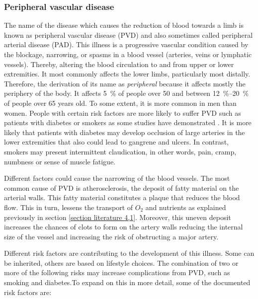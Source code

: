 \subsubsection{Peripheral vascular disease}
\label{section literature 2.1}
The name of the disease which causes the reduction of blood towards a limb is known as peripheral vascular disease (PVD) and also sometimes called peripheral arterial disease (PAD). This illness is a progressive vascular condition caused by the blockage, narrowing, or spasms in a blood vessel (arteries, veins or lymphatic vessels). Thereby, altering the blood circulation to and from upper or lower extremities.  It most commonly affects the lower limbs, particularly most distally. Therefore, the derivation of its name as \textit{peripheral} because it affects mostly the periphery of the body. It affects \SI{5}{\percent} of people over \num{50} and between \SIrange{12}{20}{\percent} of people over 65 years old. To some extent, it is more common in men than women. People with certain risk factors are more likely to suffer PVD such as patients with diabetes or smokers as some studies have demonstrated \cite{kannel1979diabetes,janka1980peripheral, menzoian1989symptomatology, eliasson2003cigarette, stephens2004cardiovascular}. It is more likely that patients with diabetes may develop occlusion of large arteries in the lower extremities that also could lead to gangrene and ulcers. In contrast, smokers may present intermittent claudication, in other words, pain, cramp, numbness or sense of muscle fatigue. 

Different factors could cause the narrowing of the blood vessels. The most common cause of PVD is atherosclerosis, the deposit of fatty material on the arterial walls. This fatty material constitutes a plaque that reduces the blood flow. This in turn, lessens the transport of $O_2$ and nutrients as explained previously in section \ref{section literature 4,1}. Moreover, this uneven deposit increases the chances of clots to form on the artery walls reducing the internal size of the vessel and increasing the risk of obstructing a major artery. 

Different risk factors are contributing to the development of this illness. Some can be inherited, others are based on lifestyle choices. The combination of two or more of the following risks may increase complications from PVD, such as smoking and diabetes.To expand on this in more detail, some of the documented risk factors are:

